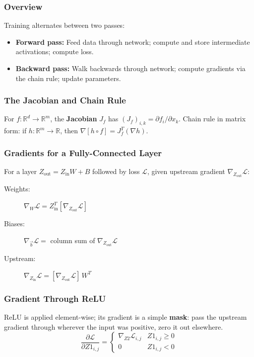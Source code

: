 \documentclass[11pt]{article}
\begin{document}
\subsubsection{Overview}

Training alternates between two passes:
\begin{itemize}
  \item \textbf{Forward pass:} Feed data through network; compute and store intermediate activations; compute loss.
  \item \textbf{Backward pass:} Walk backwards through network; compute gradients via the chain rule; update parameters.
\end{itemize}

\subsubsection{The Jacobian and Chain Rule}

For $f : \mathbb{R}^d \to \mathbb{R}^m$, the \textbf{Jacobian} $J_f$ has $(J_f)_{i,k} = \partial f_i / \partial x_k$. Chain rule in matrix form: if $h : \mathbb{R}^m \to \mathbb{R}$, then $\nabla[h \circ f] = J_f^T (\nabla h)$.

\subsubsection{Gradients for a Fully-Connected Layer}

For a layer $Z_{\text{out}} = Z_{\text{in}} W + B$ followed by loss $\mathcal{L}$, given upstream gradient $\nabla_{Z_{\text{out}}}\mathcal{L}$:

\begin{description}
  \item[Weights:] $\nabla_W \mathcal{L} = Z_{\text{in}}^T [\nabla_{Z_{\text{out}}} \mathcal{L}]$
  \item[Biases:] $\nabla_{\vec{b}} \mathcal{L} =$ column sum of $\nabla_{Z_{\text{out}}} \mathcal{L}$
  \item[Upstream:] $\nabla_{Z_{\text{in}}} \mathcal{L} = [\nabla_{Z_{\text{out}}} \mathcal{L}]\, W^T$
\end{description}

\subsubsection{Gradient Through ReLU}

ReLU is applied element-wise; its gradient is a simple \textbf{mask}: pass the upstream gradient through wherever the input was positive, zero it out elsewhere.
\[
\frac{\partial \mathcal{L}}{\partial Z1_{i,j}} = \begin{cases} \nabla_{Z2}\mathcal{L}_{i,j} & Z1_{i,j} \geq 0 \\ 0 & Z1_{i,j} < 0 \end{cases}
\]
\end{document}
